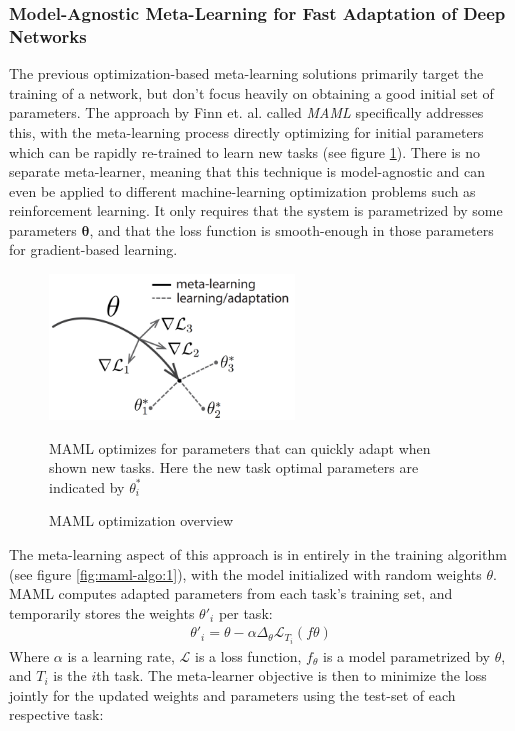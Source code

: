 \documentclass{report}
\begin{document}
	\subsubsection{Model-Agnostic Meta-Learning for Fast Adaptation of Deep Networks}
	The previous optimization-based meta-learning solutions primarily target the training of a network, but don't focus heavily on obtaining a good initial set of parameters. The approach by Finn et. al. \parencite{maml} called \emph{MAML} specifically addresses this, with the meta-learning process directly optimizing for initial parameters which can be rapidly re-trained to learn new tasks (see figure \ref{fig:maml-params:1}). There is no separate meta-learner, meaning that this technique is model-agnostic and can even be applied to different machine-learning optimization problems such as reinforcement learning. It only requires that the system is parametrized by some parameters $\bm{\theta}$, and that the loss function is smooth-enough in those parameters for gradient-based learning.
	\begin{figure}[h]
		\centering
		\includegraphics[width=6.5cm]{mamlparams}
		\caption{MAML optimization overview}
		MAML optimizes for parameters that can quickly adapt when shown new tasks. Here the new task optimal parameters are indicated by $\theta^*_i$
		\label{fig:maml-params:1}
	\end{figure}
	The meta-learning aspect of this approach is in entirely in the training algorithm (see figure \ref{fig:maml-algo:1}), with the model initialized with random weights $\theta$. MAML computes adapted parameters from each task's training set, and temporarily stores the weights $\theta'_i$ per task:
	\begin{align}
	\theta'_i = \theta - \alpha \Delta_{\theta} \mathcal{L}_{T_{i}}(f\theta)
	\end{align}
	Where $\alpha$ is a learning rate, $\mathcal{L}$ is a loss function, $f_\theta$ is a model parametrized by $\theta$, and $T_i$ is the $i$th task.
	The meta-learner objective is then to minimize the loss jointly for the updated weights and parameters using the test-set of each respective task:
\end{document}
